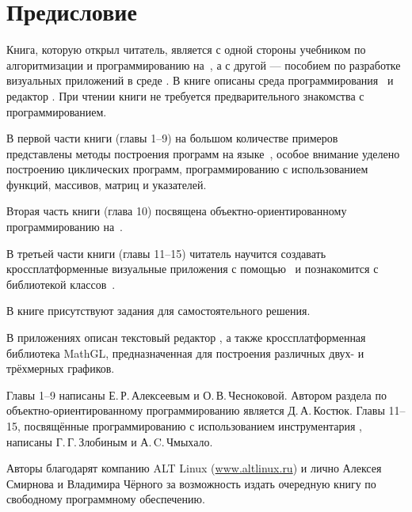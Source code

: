 \chapter*{Предисловие}
Книга, которую открыл читатель, является с одной стороны учебником по алгоритмизации и программированию на~, а с
другой --- пособием по разработке визуальных приложений в среде . В книге описаны среда программирования~ и редактор . При чтении книги не требуется предварительного знакомства с программированием. 

В первой части книги (главы 1--9) на большом количестве примеров представлены методы построения программ на языке~,
особое внимание уделено построению циклических программ, программированию с использованием функций, массивов, матриц и
указателей. 

Вторая часть книги (глава 10) посвящена объектно-ориентированному программированию на~. 

В третьей части книги (главы 11--15) читатель научится создавать кроссплатформенные визуальные приложения 
с помощью~ и познакомится с библиотекой классов~.

В книге присутствуют задания для самостоятельного решения.

В приложениях описан текстовый редактор , а также кросс\-платформенная библиотека MathGL, предназначенная для построения
различных двух- и трёхмерных графиков.

Главы 1--9 написаны Е.\,Р.\,Алексеевым и О.\,В.\,Чесноковой. Автором раздела по объектно-ориентированному программированию
является Д.\,А.\,Костюк. Главы 11--15, посвящённые программированию с использованием инструментария , написаны 
Г.\,Г.\,Злобиным и А.\,C.\,Чмыхало.

Авторы благодарят компанию ALT Linux (\url{www.altlinux.ru}) и лично Алексея Смирнова и Владимира Чёрного за  возможность
издать очередную книгу по свободному программному обеспечению.

